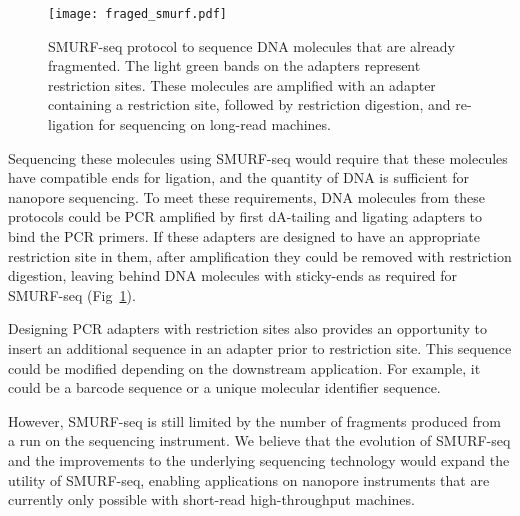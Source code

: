 \begin{figure}[t!]
\centering
\texttt{[image: fraged\_smurf.pdf]}
\caption[SMURF-seq protocol to sequence pre-fragmented DNA molecules]{
  SMURF-seq protocol to sequence DNA molecules that are
  already fragmented. The light green bands
  on the adapters represent restriction sites. These molecules are
  amplified with an adapter containing a restriction site, followed by
  restriction digestion, and re-ligation for sequencing on long-read
  machines.}
\label{fraged_smurf}
\end{figure}

Sequencing these molecules using SMURF-seq would require that these
molecules have compatible ends for ligation, and the quantity of DNA is
sufficient for nanopore sequencing.
To meet these requirements, DNA molecules from these protocols could be
PCR amplified by first dA-tailing and ligating adapters to bind the PCR
primers. If these adapters are designed to have an appropriate
restriction site in them, after amplification they could be removed with
restriction digestion, leaving behind DNA molecules with sticky-ends as
required for SMURF-seq (Fig~\ref{fraged_smurf}).

Designing PCR adapters with restriction sites  also provides an
opportunity to insert an additional sequence in an adapter prior to
restriction site. This sequence could be modified depending on the
downstream application. For example, it could be a barcode sequence or a
unique molecular identifier sequence.

However, SMURF-seq is still limited by the number of fragments produced
from a run on the sequencing instrument.  We believe that the evolution
of SMURF-seq and the improvements to the underlying sequencing
technology would expand the utility of SMURF-seq, enabling applications
on nanopore instruments that are currently only possible with short-read
high-throughput machines.
